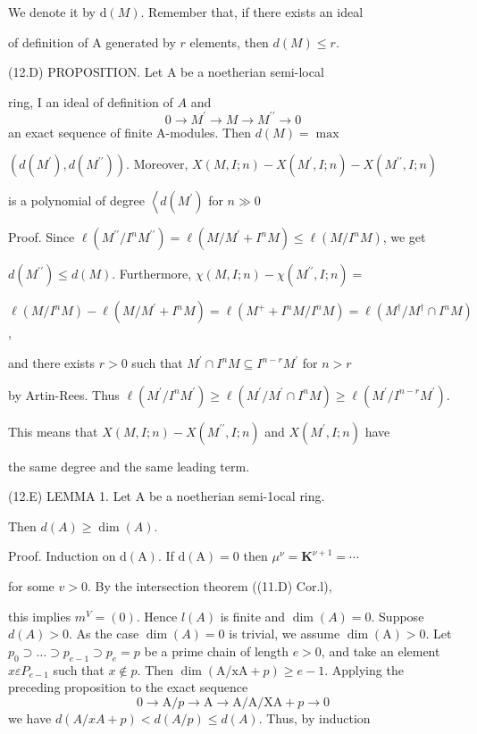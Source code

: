 We denote it by $\mathrm{d}(M)$. Remember that, if there exists an ideal

of definition of A generated by $r$ elements, then $d(M) \leqslant r$.

(12.D) PROPOSITION. Let A be a noetherian semi-local

ring, I an ideal of definition of $A$ and
$$
0 \rightarrow M^{\prime} \rightarrow M \rightarrow M^{\prime \prime} \rightarrow 0
$$
an exact sequence of finite A-modules. Then $d(M)=\max$

$\left(d\left(M^{\prime}\right), d\left(M^{\prime \prime}\right)\right)$. Moreover, $X(M, I ; n)-X\left(M^{\prime}, I ; n\right)-X\left(M^{\prime \prime}, I ; n\right)$

is a polynomial of degree $\left\langle d\left(M^{\prime}\right)\right.$ for $n \gg 0$

Proof. Since $\ell\left(M^{\prime \prime} / I^{n} M^{\prime \prime}\right)=\ell\left(M / M^{\prime}+I^{n} M\right) \leqslant \ell\left(M / I^{n} M\right)$, we get

$d\left(M^{\prime \prime}\right) \leqslant d(M)$. Furthermore, $\chi(M, I ; n)-\chi\left(M^{\prime \prime}, I ; n\right)=$

$\ell\left(M / I^{n} M\right)-\ell\left(M / M^{\prime}+I^{n} M\right)=\ell\left(M^{+}+I^{n} M / I^{n} M\right)=\ell\left(M^{\dagger} / M^{\dagger} \cap I^{n} M\right)$,

and there exists $r>0$ such that $M^{\prime} \cap I^{n} M \subseteq I^{n-r} M^{\prime}$ for $n>r$

by Artin-Rees. Thus $\ell\left(M^{\prime} / I^{n} M^{\prime}\right) \geqslant \ell\left(M^{\prime} / M^{\prime} \cap I^{n} M\right) \geqslant \ell\left(M^{\prime} / I^{n-r} M^{\prime}\right)$.

This means that $X(M, I ; n)-X\left(M^{\prime \prime}, I ; n\right)$ and $X\left(M^{\prime}, I ; n\right)$ have

the same degree and the same leading term.

(12.E) LEMMA 1. Let A be a noetherian semi-1ocal ring.

Then $d(A) \geqslant \operatorname{dim}(A)$.

Proof. Induction on $\mathrm{d}(\mathrm{A})$. If $\mathrm{d}(\mathrm{A})=0$ then $\mu^{\nu}=\boldsymbol{K}^{\nu+1}=\cdots$

for some $v>0$. By the intersection theorem ((11.D) Cor.l),

this implies $m^{V}=(0)$. Hence $l(A)$ is finite and $\operatorname{dim}(A)=0$. Suppose $d(A)>0$. As the case $\operatorname{dim}(A)=0$ is trivial, we assume $\operatorname{dim}(\mathrm{A})>0$. Let $p_{0} \supset \ldots \supset p_{e-1} \supset p_{e}=p$ be a prime chain of length $e>0$, and take an element $x \varepsilon P_{e-1}$ such that $x \notin p .$ Then $\operatorname{dim}(\mathrm{A} / \mathrm{xA}+p) \geqslant e-1$. Applying the preceding proposition to the exact sequence
$$
0 \rightarrow \mathrm{A} / p \rightarrow \mathrm{A} \rightarrow \mathrm{A} / \mathrm{A} / \mathrm{XA}+p \rightarrow 0
$$
we have $d(A / x A+p)<d(A / p) \leqslant d(A)$. Thus, by induction

